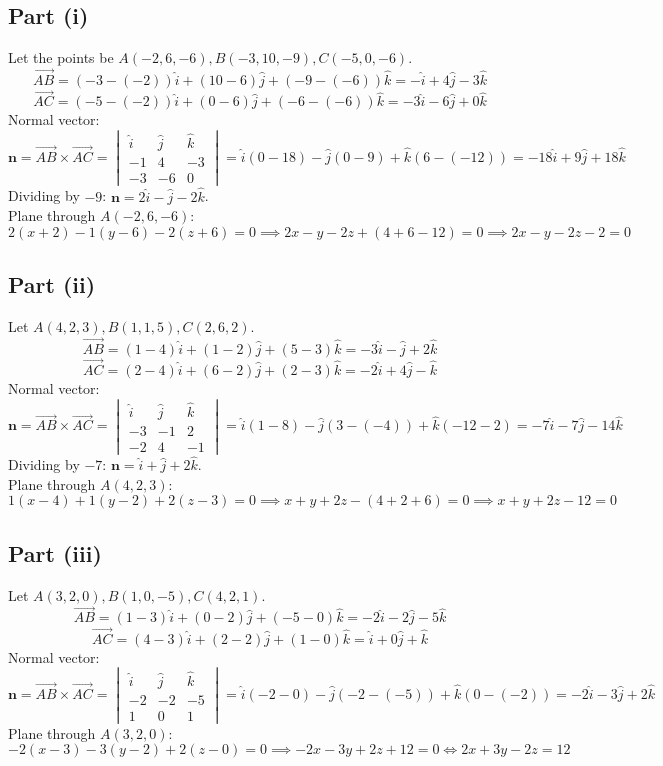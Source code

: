 \documentclass[11pt,a4paper]{article}
\begin{document}
\subsection*{Part (i)}
Let the points be $A(-2, 6, -6), B(-3, 10, -9), C(-5, 0, -6)$.
$$\vec{AB} = (-3 - (-2))\hat{i} + (10 - 6)\hat{j} + (-9 - (-6))\hat{k} = -\hat{i} + 4\hat{j} - 3\hat{k}$$
$$\vec{AC} = (-5 - (-2))\hat{i} + (0 - 6)\hat{j} + (-6 - (-6))\hat{k} = -3\hat{i} - 6\hat{j} + 0\hat{k}$$
Normal vector:
$$\mathbf{n} = \vec{AB} \times \vec{AC} = \begin{vmatrix} \hat{i} & \hat{j} & \hat{k} \\ -1 & 4 & -3 \\ -3 & -6 & 0 \end{vmatrix} = \hat{i}(0 - 18) - \hat{j}(0 - 9) + \hat{k}(6 - (-12)) = -18\hat{i} + 9\hat{j} + 18\hat{k}$$
Dividing by $-9$: $\mathbf{n} = 2\hat{i} - \hat{j} - 2\hat{k}$.\\
Plane through $A(-2, 6, -6)$:
$$2(x + 2) - 1(y - 6) - 2(z + 6) = 0 \implies 2x - y - 2z + (4 + 6 - 12) = 0 \implies 2x - y - 2z - 2 = 0$$

\subsection*{Part (ii)}
Let $A(4, 2, 3), B(1, 1, 5), C(2, 6, 2)$.
$$\vec{AB} = (1 - 4)\hat{i} + (1 - 2)\hat{j} + (5 - 3)\hat{k} = -3\hat{i} - \hat{j} + 2\hat{k}$$
$$\vec{AC} = (2 - 4)\hat{i} + (6 - 2)\hat{j} + (2 - 3)\hat{k} = -2\hat{i} + 4\hat{j} - \hat{k}$$
Normal vector:
$$\mathbf{n} = \vec{AB} \times \vec{AC} = \begin{vmatrix} \hat{i} & \hat{j} & \hat{k} \\ -3 & -1 & 2 \\ -2 & 4 & -1 \end{vmatrix} = \hat{i}(1 - 8) - \hat{j}(3 - (-4)) + \hat{k}(-12 - 2) = -7\hat{i} - 7\hat{j} - 14\hat{k}$$
Dividing by $-7$: $\mathbf{n} = \hat{i} + \hat{j} + 2\hat{k}$.\\
Plane through $A(4, 2, 3)$:
$$1(x - 4) + 1(y - 2) + 2(z - 3) = 0 \implies x + y + 2z - (4 + 2 + 6) = 0 \implies x + y + 2z - 12 = 0$$

\subsection*{Part (iii)}
Let $A(3, 2, 0), B(1, 0, -5), C(4, 2, 1)$.
$$\vec{AB} = (1 - 3)\hat{i} + (0 - 2)\hat{j} + (-5 - 0)\hat{k} = -2\hat{i} - 2\hat{j} - 5\hat{k}$$
$$\vec{AC} = (4 - 3)\hat{i} + (2 - 2)\hat{j} + (1 - 0)\hat{k} = \hat{i} + 0\hat{j} + \hat{k}$$
Normal vector:
$$\mathbf{n} = \vec{AB} \times \vec{AC} = \begin{vmatrix} \hat{i} & \hat{j} & \hat{k} \\ -2 & -2 & -5 \\ 1 & 0 & 1 \end{vmatrix} = \hat{i}(-2 - 0) - \hat{j}(-2 - (-5)) + \hat{k}(0 - (-2)) = -2\hat{i} - 3\hat{j} + 2\hat{k}$$
Plane through $A(3, 2, 0)$:
$$-2(x - 3) - 3(y - 2) + 2(z - 0) = 0 \implies -2x - 3y + 2z + 12 = 0 \iff 2x + 3y - 2z = 12$$
\end{document}
